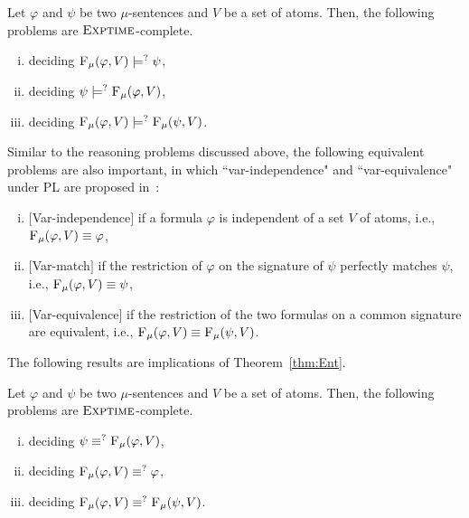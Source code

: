 \documentclass[runningheads]{llncs}
\begin{document}
\begin{theorem}[Entailment]
	\label{thm:Ent}
Let $\varphi$ and $\psi$ be two $\mu$-sentences and $V$ be a set of atoms. Then, the following problems are $\textsc{Exptime}$-complete.
\begin{enumerate}[(i)]
  \item deciding  ${\textsc{F}_{\textsc{$\mu$}}}(\varphi, V ) \models^? \psi$,
  \item deciding  $\psi \models^? {\textsc{F}_{\textsc{$\mu$}}}(\varphi, V)$,
  \item deciding ${\textsc{F}_{\textsc{$\mu$}}}(\varphi, V) \models^? {\textsc{F}_{\textsc{$\mu$}}}(\psi, V)$.
\end{enumerate}
\end{theorem}
%

Similar to the reasoning problems discussed above, the following equivalent problems are also important, in which ``var-independence" and ``var-equivalence" under PL are proposed in~\cite{lang2003propositional}:
\begin{enumerate}[(i)]
    \item $[$Var-independence$]$ if a formula $\varphi$ is independent of a set $V$ of atoms, i.e., ${\textsc{F}_{\textsc{$\mu$}}}(\varphi,V) \equiv \varphi$,
    \item $[$Var-match$]$ if the restriction of $\varphi$ on the signature of $\psi$ perfectly matches $\psi$, i.e., ${\textsc{F}_{\textsc{$\mu$}}}(\varphi, V) \equiv \psi$,
    \item $[$Var-equivalence$]$ if the restriction of the two formulas on a common signature are equivalent, i.e., ${\textsc{F}_{\textsc{$\mu$}}}(\varphi, V) \equiv {\textsc{F}_{\textsc{$\mu$}}}(\psi, V)$.
\end{enumerate}

The following results are implications of Theorem~\ref{thm:Ent}.

\begin{corollary}\label{cor:equiv}
Let $\varphi$ and $\psi$ be two $\mu$-sentences and $V$ be a set of atoms. Then, the following problems are $\textsc{Exptime}$-complete.
\begin{enumerate}[(i)]
  \item deciding $\psi \equiv^?{\textsc{F}_{\textsc{$\mu$}}}(\varphi, V)$,
  \item deciding ${\textsc{F}_{\textsc{$\mu$}}}(\varphi, V) \equiv^? \varphi$,
  \item deciding ${\textsc{F}_{\textsc{$\mu$}}}(\varphi, V) \equiv^? {\textsc{F}_{\textsc{$\mu$}}}(\psi, V)$.
\end{enumerate}
\end{corollary}
\end{document}
